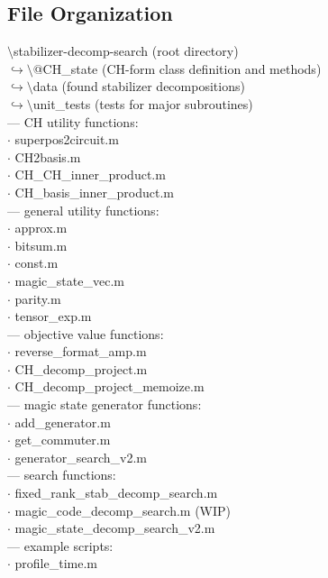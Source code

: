 \documentclass[11pt]{article}
\newcommand{\blank}[1]{\hspace*{#1}}
\begin{document}
\subsection{File Organization}
$\setminus$stabilizer-decomp-search (root directory)\\
 \blank{1cm} $\hookrightarrow \setminus$@CH\_state (CH-form class definition and methods) \\
 \blank{1cm} $\hookrightarrow \setminus$data (found stabilizer decompositions)\\
 \blank{1cm} $\hookrightarrow \setminus$unit\_tests (tests for major subroutines)\\
 \blank{1cm} --- CH utility functions:\\
 \blank{1cm} $\cdot$ superpos2circuit.m\\
 \blank{1cm} $\cdot$ CH2basis.m\\
 \blank{1cm} $\cdot$ CH\_CH\_inner\_product.m\\
 \blank{1cm} $\cdot$ CH\_basis\_inner\_product.m\\
 \blank{1cm} --- general utility functions:\\
 \blank{1cm} $\cdot$ approx.m\\
 \blank{1cm} $\cdot$ bitsum.m\\
 \blank{1cm} $\cdot$ const.m\\
 \blank{1cm} $\cdot$ magic\_state\_vec.m\\
 \blank{1cm} $\cdot$ parity.m\\
 \blank{1cm} $\cdot$ tensor\_exp.m\\
 \blank{1cm} --- objective value functions:\\
 \blank{1cm} $\cdot$ reverse\_format\_amp.m\\
 \blank{1cm} $\cdot$ CH\_decomp\_project.m\\
 \blank{1cm} $\cdot$ CH\_decomp\_project\_memoize.m\\
 \blank{1cm} --- magic state generator functions:\\
 \blank{1cm} $\cdot$ add\_generator.m\\
 \blank{1cm} $\cdot$ get\_commuter.m\\
 \blank{1cm} $\cdot$ generator\_search\_v2.m\\
 \blank{1cm} --- search functions:\\
 \blank{1cm} $\cdot$ fixed\_rank\_stab\_decomp\_search.m\\
 \blank{1cm} $\cdot$ magic\_code\_decomp\_search.m (WIP)\\
 \blank{1cm} $\cdot$ magic\_state\_decomp\_search\_v2.m\\
 \blank{1cm} --- example scripts:\\
 \blank{1cm} $\cdot$ profile\_time.m\\
 
\end{document}

